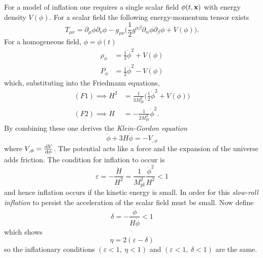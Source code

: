 For a model of inflation one requires a single scalar field \(\phi(t,\vb{x})\) with energy density \(V(\phi)\).
For a scalar field the following energy-momentum tensor exists
%
\begin{equation}
	T_{\mu\nu}
	= \partial_{\mu}\phi \partial_{\nu}\phi
	- g_{\mu\nu}\bigg( \frac{1}{2}g^{\alpha\beta} \partial_{\alpha}\phi \partial_{\beta}\phi + V(\phi) \bigg).
\end{equation}
%
For a homogeneous field, \ie{} \(\phi = \phi(t)\)
%
\begin{subequations}
	\begin{align}
		\rho_{\phi} & = \frac{1}{2}\dot{\phi}^{2} + V(\phi) \\
		P_{\phi}    & = \frac{1}{2}\dot{\phi}^{2} - V(\phi)
	\end{align}
\end{subequations}
%
which, substituting into the Friedmann equations,
%
\begin{subequations}
	\begin{align}
		(F1) \implies H^{2}   & = \frac{1}{3M_{\text{pl}}^{2}} \bigg(\frac{1}{2}\dot{\phi}^{2} + V(\phi) \bigg) \\
		(F2) \implies \dot{H} & = -\frac{1}{2M_{\text{pl}}^{2}} \dot{\phi}^{2}.
	\end{align}
\end{subequations}
%
By combining these one derives the \emph{Klein-Gordon equation}
%
\begin{equation}\label{eq:KG}
	\ddot{\phi} + 3H\dot{\phi}
	= -V_{,\phi}
\end{equation}
%
where \(V_{,\phi} = \dv{V}{\phi}\).
The potential acts like a force and the expansion of the universe adds friction.
The condition for inflation to occur is
%
\begin{equation}
	\varepsilon
	= -\frac{\dot{H}}{H^{2}}
	= \frac{1}{M_{\text{pl}}^{2}} \frac{\dot{\phi}^{2}}{H^{2}}
	< 1
\end{equation}
%
and hence inflation occurs if the kinetic energy is small.
In order for this \emph{slow-roll inflation} to persist the acceleration of the scalar field must be small.
Now define
%
\begin{equation}
	\delta
	= -\frac{\ddot{\phi}}{H\dot{\phi}}
	< 1
\end{equation}
%
which shows
%
\begin{equation}
	\eta
	= 2(\varepsilon - \delta)
\end{equation}
%
so the inflationary conditions \((\varepsilon<1,\ \eta<1)\) and \((\varepsilon<1,\ \delta<1)\) are the same.
